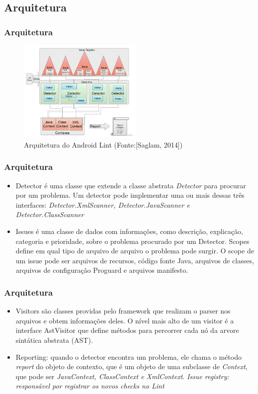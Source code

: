 \documentclass{beamer}
\begin{document}
   \subsection{Arquitetura}
   \frame
   {
        \frametitle{Arquitetura}
        \begin{figure}
            \centering
            \includegraphics[width=6cm]{img/lint_architecture}
            \caption{Arquitetura do Android Lint (Fonte:[Saglam, 2014])}
            \label{Fonte:[Saglam, 2014]}
        \end{figure}
   }
   \frame
   {
        \frametitle{Arquitetura}
        \begin{itemize}
            \item Detector é uma classe que extende a classe abstrata {\it Detector}
            para procurar por um problema. Um detector pode implementar uma ou mais
            dessas três interfaces: {\it Detector.XmlScanner, Detector.JavaScanner e
            Detector.ClassScanner}
            \item Issues é uma classe de dados com informações, como descrição,
            explicação, categoria e prioridade, sobre o problema procurado por um
            Detector. Scopes define em qual tipo de arquivo de arquivo o problema
            pode surgir. O scope de um issue pode ser arquivos de recursos, código
            fonte Java, arquivos de classes, arquivos de configuração Proguard e
            arquivos manifesto.
         \end{itemize}
   }
   \frame
   {
        \frametitle{Arquitetura}
        \begin{itemize}       
            \item Visitors são classes providas pelo framework que realizam o parser
            nos arquivos e obtem informações deles. O nível mais alto de um visitor
            é a interface AstVisitor que define métodos para percorrer cada nó da 
            arvore sintática abstrata (AST).
            \item Reporting: quando o detector encontra um problema, ele chama o método
            {\it report} do objeto de contexto, que é um objeto de uma subclasse de
            {\it Context}, que pode ser {\it JavaContext, ClassContext e XmlContext}.
            {\it Issue registry: responsável por registrar os novos checks no Lint}
        \end{itemize}
   }
\end{document}
